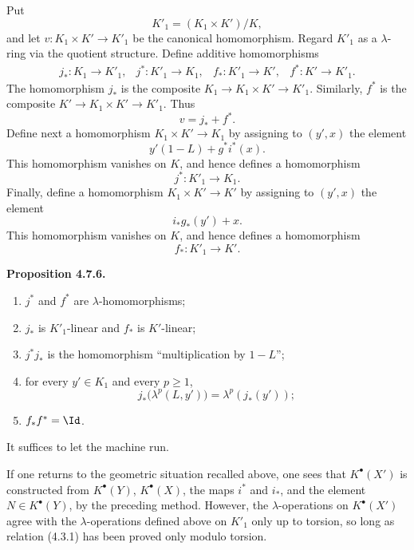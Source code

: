 Put
\[
  K'_1=(K_1\times K')/K,
\]
and let \(v:K_1\times K'\to K'_1\) be the canonical homomorphism. Regard \(K'_1\) as a \(\lambda\)-ring via the quotient structure. Define additive homomorphisms
\[
\begin{array}{llll}
j_*:K_1\to K'_1, & j^*:K'_1\to K_1, &
f_*:K'_1\to K', & f^*:K'\to K'_1 .
\end{array}
\]
The homomorphism \(j_*\) is the composite \(K_1\to K_1\times K'\to K'_1\). Similarly, \(f^*\) is the composite \(K'\to K_1\times K'\to K'_1\). Thus
\[
  v=j_*+f^*.
\]
Define next a homomorphism \(K_1\times K'\to K_1\) by assigning to \((y',x)\) the element
\[
  y'(1-L)+g^*i^*(x).
\]
This homomorphism vanishes on \(K\), and hence defines a homomorphism
\[
  j^*:K'_1\longrightarrow K_1.
\]
Finally, define a homomorphism \(K_1\times K'\to K'\) by assigning to \((y',x)\) the element
\[
  i_*g_*(y')+x.
\]
This homomorphism vanishes on \(K\), and hence defines a homomorphism
\[
  f_*:K'_1\longrightarrow K'.
\]

\textbf{Proposition 4.7.6.}
\begin{enumerate}[label=\roman*)]
\item \(j^*\) and \(f^*\) are \(\lambda\)-homomorphisms;
\item \(j_*\) is \(K'_1\)-linear and \(f_*\) is \(K'\)-linear;
\item \(j^*j_*\) is the homomorphism ``multiplication by \(1-L\)'';
\item for every \(y'\in K_1\) and every \(p\ge1\),
\[
  j_*\bigl(\lambda^p(L,y')\bigr)=\lambda^p(j_*(y'));
\]
\item \(f_*f^*=\Id\).
\end{enumerate}
It suffices to let the machine run.

If one returns to the geometric situation recalled above, one sees that \(K^\bullet(X')\) is constructed from \(K^\bullet(Y)\), \(K^\bullet(X)\), the maps \(i^*\) and \(i_*\), and the element \(N\in K^\bullet(Y)\), by the preceding method. However, the \(\lambda\)-operations on \(K^\bullet(X')\) agree with the \(\lambda\)-operations defined above on \(K'_1\) only up to torsion, so long as relation (4.3.1) has been proved only modulo torsion.


